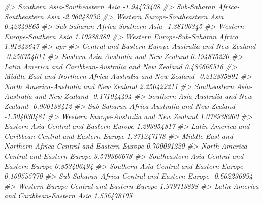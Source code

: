 \documentclass[
]{book}
\newenvironment{Shaded}{\begin{snugshade}}{\end{snugshade}}
\newcommand{\CommentTok}[1]{\textcolor[rgb]{0.56,0.35,0.01}{\textit{#1}}}
\theoremstyle{definition}
\theoremstyle{definition}
\theoremstyle{definition}
\theoremstyle{definition}
\theoremstyle{remark}
\begin{document}
\begin{Shaded}
\begin{Highlighting}[]
\CommentTok{\#\textgreater{} Southern Asia{-}Southeastern Asia                             {-}1.94473408}
\CommentTok{\#\textgreater{} Sub{-}Saharan Africa{-}Southeastern Asia                        {-}2.06248932}
\CommentTok{\#\textgreater{} Western Europe{-}Southeastern Asia                             0.42249865}
\CommentTok{\#\textgreater{} Sub{-}Saharan Africa{-}Southern Asia                            {-}1.38106345}
\CommentTok{\#\textgreater{} Western Europe{-}Southern Asia                                 1.10988389}
\CommentTok{\#\textgreater{} Western Europe{-}Sub{-}Saharan Africa                            1.91843647}
\CommentTok{\#\textgreater{}                                                                      upr}
\CommentTok{\#\textgreater{} Central and Eastern Europe{-}Australia and New Zealand        {-}0.256754011}
\CommentTok{\#\textgreater{} Eastern Asia{-}Australia and New Zealand                       0.194875220}
\CommentTok{\#\textgreater{} Latin America and Caribbean{-}Australia and New Zealand        0.485666516}
\CommentTok{\#\textgreater{} Middle East and Northern Africa{-}Australia and New Zealand   {-}0.212835891}
\CommentTok{\#\textgreater{} North America{-}Australia and New Zealand                      2.250422211}
\CommentTok{\#\textgreater{} Southeastern Asia{-}Australia and New Zealand                 {-}0.171044494}
\CommentTok{\#\textgreater{} Southern Asia{-}Australia and New Zealand                     {-}0.900138412}
\CommentTok{\#\textgreater{} Sub{-}Saharan Africa{-}Australia and New Zealand                {-}1.504030481}
\CommentTok{\#\textgreater{} Western Europe{-}Australia and New Zealand                     1.078938960}
\CommentTok{\#\textgreater{} Eastern Asia{-}Central and Eastern Europe                      1.293954817}
\CommentTok{\#\textgreater{} Latin America and Caribbean{-}Central and Eastern Europe       1.371247178}
\CommentTok{\#\textgreater{} Middle East and Northern Africa{-}Central and Eastern Europe   0.700091220}
\CommentTok{\#\textgreater{} North America{-}Central and Eastern Europe                     3.579366678}
\CommentTok{\#\textgreater{} Southeastern Asia{-}Central and Eastern Europe                 0.853406494}
\CommentTok{\#\textgreater{} Southern Asia{-}Central and Eastern Europe                     0.169555770}
\CommentTok{\#\textgreater{} Sub{-}Saharan Africa{-}Central and Eastern Europe               {-}0.662236994}
\CommentTok{\#\textgreater{} Western Europe{-}Central and Eastern Europe                    1.979713898}
\CommentTok{\#\textgreater{} Latin America and Caribbean{-}Eastern Asia                     1.536478105}

\end{Highlighting}
\end{Shaded}
\end{document}
